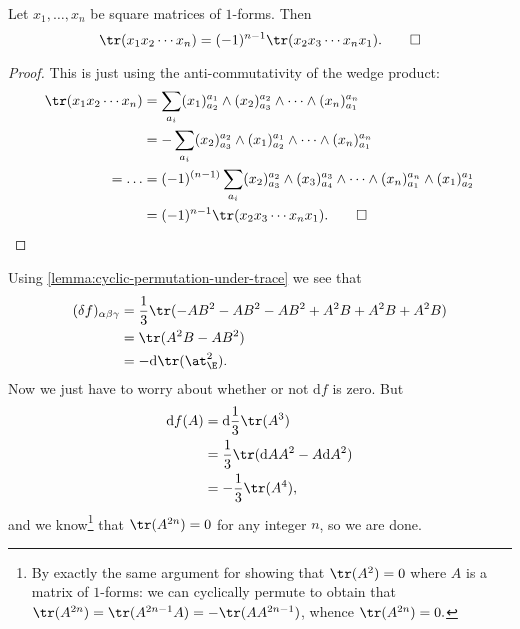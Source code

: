             \begin{lemma}\label{lemma:cyclic-permutation-under-trace}
                Let $x_1,\ldots,x_n$ be square matrices of $1$-forms.
                Then \[
                    \tr(x_1x_2\cdots x_n) = (-1)^{n-1}\tr(x_2x_3\cdots x_nx_1).\qedhere
                \]
            \end{lemma}
            
            \begin{proof}
                This is just using the anti-commutativity of the wedge product:
                \begin{align*}
                    \tr(x_1x_2\cdots x_n) &= \sum_{a_i}(x_1)^{a_1}_{a_2}\wedge(x_2)^{a_2}_{a_3}\wedge\cdots\wedge(x_n)^{a_n}_{a_1}\\
                    &= -\sum_{a_i}(x_2)^{a_2}_{a_3}\wedge(x_1)^{a_1}_{a_2}\wedge\cdots\wedge(x_n)^{a_n}_{a_1}\\
                    = \ldots &= (-1)^{(n-1)} \sum_{a_i}(x_2)^{a_2}_{a_3}\wedge(x_3)^{a_3}_{a_4}\wedge\cdots\wedge(x_n)^{a_n}_{a_1}\wedge(x_1)^{a_1}_{a_2}\\
                    &= (-1)^{n-1}\tr(x_2x_3\cdots x_nx_1).\qedhere
                \end{align*}
            \end{proof}
            
            Using \cref{lemma:cyclic-permutation-under-trace} we see that
            \begin{align*}
                (\delta f)_{\alpha\beta\gamma} &= \frac13\tr(-AB^2-AB^2-AB^2+A^2B+A^2B+A^2B)\\
                &= \tr(A^2B - AB^2)\\
                &= -\mathrm{d}\tr(\at_\E^2).
            \end{align*}
            Now we just have to worry about whether or not $\mathrm{d}f$ is zero.
            But
            \begin{align*}
                \mathrm{d}f(A) &= \mathrm{d}\frac13\tr(A^3)\\
                &= \frac13\tr(\mathrm{d}A A^2-A\mathrm{d}A^2)\\
                &= -\frac13\tr(A^4),
            \end{align*}
            and we know\footnote{By exactly the same argument for showing that $\tr(A^2)=0$ where $A$ is a matrix of $1$-forms: we can cyclically permute to obtain that $\tr(A^{2n})=\tr(A^{2n-1}A)=-\tr(AA^{2n-1})$, whence $\tr(A^{2n})=0.$} that $\tr(A^{2n})=0$ for any integer $n$, so we are done.

